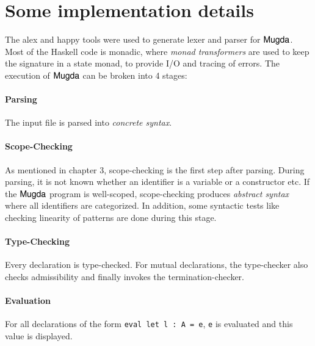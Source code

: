 \section{Some implementation details}
The alex \cite{alex} and happy \cite{happy} tools were used to generate lexer and parser for $\textsf{Mugda}$.
Most of the Haskell code is monadic, where \emph{monad transformers} \cite{Grabmueller2006MonadTransformers} are used to keep the signature in a state monad, to provide I/O and tracing of errors. The execution of $\textsf{Mugda}$ can be broken into 4 stages:
\paragraph*{Parsing}
The input file is parsed into \emph{concrete syntax}.
\paragraph*{Scope-Checking}
As mentioned in chapter 3, scope-checking is the first step after parsing.
During parsing, it is not known whether an identifier is a variable or a constructor etc.
If the $\textsf{Mugda}$ program is well-scoped, scope-checking produces \emph{abstract syntax} where all identifiers are categorized. In addition, some syntactic tests like checking linearity of patterns are done during this stage.
\paragraph*{Type-Checking}
Every declaration is type-checked.
For mutual declarations, the type-checker also checks admissibility and finally invokes the termination-checker.
\paragraph*{Evaluation}
For all declarations of the form \verb+eval let l : A = e+, \verb+e+ is evaluated and this value is displayed.
